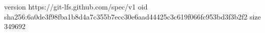 version https://git-lfs.github.com/spec/v1
oid sha256:6a0de3f98fba1b8d4a7c355b7ecc30e6aad44425c3c619f066fc953bd3f3b2f2
size 349692
